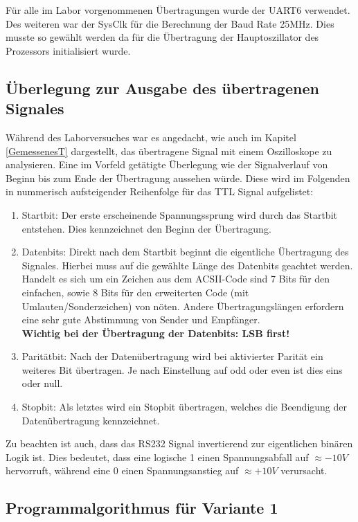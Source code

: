 Für alle im Labor vorgenommenen Übertragungen wurde der UART6 verwendet. Des weiteren war der SysClk für die Berechnung der Baud Rate 25MHz. Dies musste so gewählt werden da für die Übertragung der Hauptoszillator des Prozessors initialisiert wurde.

\newpage

\subsection{Überlegung zur Ausgabe des übertragenen Signales}
Während des Laborversuches war es angedacht, wie auch im Kapitel \ref{GemessenesT} dargestellt, das übertragene Signal mit einem Oszilloskope zu analysieren. Eine im Vorfeld getätigte Überlegung wie der Signalverlauf von Beginn bis zum Ende der Übertragung aussehen würde. Diese wird im Folgenden in nummerisch aufsteigender Reihenfolge für das TTL Signal aufgelistet:
\begin{enumerate}
	\item Startbit: Der erste erscheinende Spannungssprung wird durch das Startbit entstehen. Dies kennzeichnet den Beginn der Übertragung.
	\item Datenbits: Direkt nach dem Startbit beginnt die eigentliche Übertragung des Signales. Hierbei muss auf die gewählte Länge des Datenbits geachtet werden. Handelt es sich um ein Zeichen aus dem ACSII-Code sind 7 Bits für den einfachen, sowie 8 Bits für den erweiterten Code (mit Umlauten/Sonderzeichen) von nöten. Andere Übertragungslängen erfordern eine sehr gute Abstimmung von Sender und Empfänger.\\
	\textbf{Wichtig bei der Übertragung der Datenbits: LSB first!}
	\item Paritätbit: Nach der Datenübertragung wird bei aktivierter Parität ein weiteres Bit übertragen. Je nach Einstellung auf odd oder even ist dies eins oder null.
	\item Stopbit: Als letztes wird ein Stopbit übertragen, welches die Beendigung der Datenübertragung kennzeichnet.
\end{enumerate}

Zu beachten ist auch, dass das RS232 Signal invertierend zur eigentlichen binären Logik ist. Dies bedeutet, dass eine logische 1 einen Spannungsabfall auf $\approx -10V$ hervorruft, während eine 0 einen Spannungsanstieg auf $\approx +10V$ verursacht.\\

\newpage

	\subsection{Programmalgorithmus für Variante 1} \label{ProgrammalotihmusAufgabenteil1}
	
